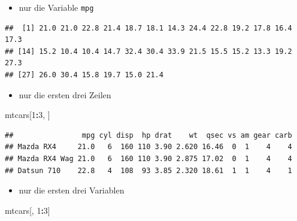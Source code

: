 \documentclass[12pt,a4paper]{article}
\newenvironment{Shaded}{\begin{snugshade}}{\end{snugshade}}
\newcommand{\DecValTok}[1]{\textcolor[rgb]{0.00,0.00,0.81}{#1}}
\newcommand{\NormalTok}[1]{#1}
\newcommand{\SpecialCharTok}[1]{\textcolor[rgb]{0.81,0.36,0.00}{\textbf{#1}}}
\begin{document}
\begin{itemize}
  \item nur die Variable \texttt{mpg}
\end{itemize}

\begin{Shaded}
\end{Shaded}

\begin{verbatim}
##  [1] 21.0 21.0 22.8 21.4 18.7 18.1 14.3 24.4 22.8 19.2 17.8 16.4 17.3
## [14] 15.2 10.4 10.4 14.7 32.4 30.4 33.9 21.5 15.5 15.2 13.3 19.2 27.3
## [27] 26.0 30.4 15.8 19.7 15.0 21.4
\end{verbatim}

\begin{itemize}
  \item nur die ersten drei Zeilen
\end{itemize}

\begin{Shaded}
\begin{Highlighting}[]
\NormalTok{    mtcars[}\DecValTok{1}\SpecialCharTok{:}\DecValTok{3}\NormalTok{, ]}
\end{Highlighting}
\end{Shaded}

\begin{verbatim}
##                mpg cyl disp  hp drat    wt  qsec vs am gear carb
## Mazda RX4     21.0   6  160 110 3.90 2.620 16.46  0  1    4    4
## Mazda RX4 Wag 21.0   6  160 110 3.90 2.875 17.02  0  1    4    4
## Datsun 710    22.8   4  108  93 3.85 2.320 18.61  1  1    4    1
\end{verbatim}

\begin{itemize}
  \item nur die ersten drei Variablen
\end{itemize}

\begin{Shaded}
\begin{Highlighting}[]
\NormalTok{    mtcars[, }\DecValTok{1}\SpecialCharTok{:}\DecValTok{3}\NormalTok{]}
\end{Highlighting}
\end{Shaded}
\end{document}
